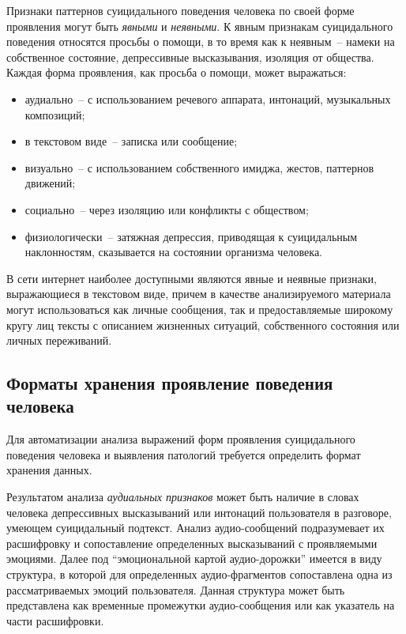 Признаки паттернов суицидального поведения человека по своей форме проявления могут быть \textit{явными} и \textit{неявными}. К явным признакам суицидального поведения относятся просьбы о помощи, в то время как к неявным~-- намеки на собственное состояние, депрессивные высказывания, изоляция от общества. Каждая форма проявления, как просьба о помощи, может выражаться:

\begin{itemize}
	\item аудиально~-- с использованием речевого аппарата, интонаций, музыкальных композиций;
	\item в текстовом виде~-- записка или сообщение;
	\item визуально~-- с использованием собственного имиджа, жестов, паттернов движений;
	\item социально~-- через изоляцию или конфликты с обществом;
	\item физиологически~-- затяжная депрессия, приводящая к суицидальным наклонностям, сказывается на состоянии организма человека.
\end{itemize}

В сети интернет наиболее доступными являются явные и неявные признаки, выражающиеся в текстовом виде, причем в качестве анализируемого материала могут использоваться как личные сообщения, так и предоставляемые широкому кругу лиц тексты с описанием жизненных ситуаций, собственного состояния или личных переживаний.

\subsection{Форматы хранения проявление поведения человека}

Для автоматизации анализа выражений форм проявления суицидального поведения человека и выявления патологий требуется определить формат хранения данных.

Результатом анализа \textit{аудиальных признаков} может быть наличие в словах человека депрессивных высказываний или интонаций пользователя в разговоре, умеющем суицидальный подтекст. Анализ аудио-сообщений подразумевает их расшифровку и сопоставление определенных высказываний с проявляемыми эмоциями. Далее под ``эмоциональной картой аудио-дорожки'' имеется в виду структура, в которой для определенных аудио-фрагментов сопоставлена одна из рассматриваемых эмоций пользователя. Данная структура может быть представлена как временные промежутки аудио-сообщения или как указатель на части расшифровки. 


